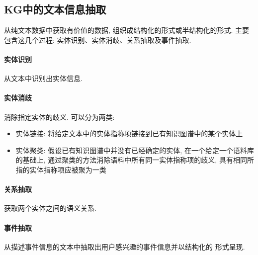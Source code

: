 \subsection{KG中的文本信息抽取}
从纯文本数据中获取有价值的数据, 组织成结构化的形式或半结构化的形式. 主要包含这几个过程: 实体识别、实体消歧、关系抽取及事件抽取. 
\paragraph{实体识别}从文本中识别出实体信息. 

\paragraph{实体消歧}消除指定实体的歧义. 可以分为两类: 
\begin{itemize}
	\item 实体链接: 将给定文本中的实体指称项链接到已有知识图谱中的某个实体上
	\item 实体聚类: 假设已有知识图谱中并没有已经确定的实体, 在一个给定一个语料库的基础上, 通过聚类的方法消除语料中所有同一实体指称项的歧义, 具有相同所指的实体指称项应被聚为一类
\end{itemize}

\paragraph{关系抽取}获取两个实体之间的语义关系. 

\paragraph{事件抽取}从描述事件信息的文本中抽取出用户感兴趣的事件信息并以结构化的
形式呈现. 
